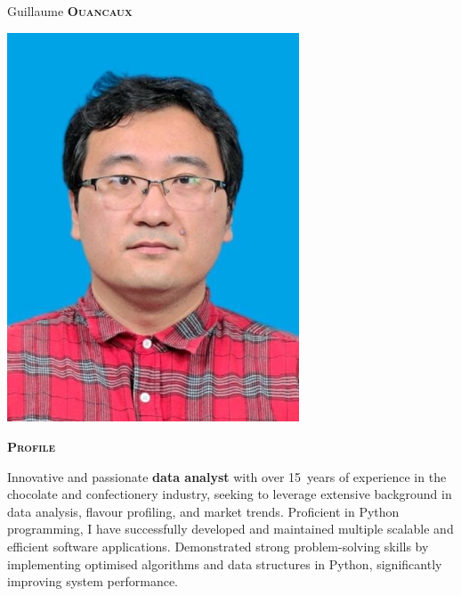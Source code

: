 \documentclass[11pt, a4paper]{article}
\newcommand{\headleft}[1]{\vspace*{3ex}\textsc{\textbf{#1}}\par%
    \vspace*{-1.5ex}\hrulefill\par\vspace*{0.7ex}}
\begin{document}
\setlength{\topskip}{0pt}
\setlength{\parindent}{0pt}
\setlength{\parskip}{0pt}
\setlength{\fboxsep}{0pt}
\pagestyle{empty}
\raggedbottom

\begin{minipage}[t]{0.33\textwidth} %
\colorbox{cvblue}{\begin{minipage}[t][5mm][t]{\textwidth}\null\hfill\null\end{minipage}}

\vspace{-.2ex} %
\colorbox{cvblue!90}{\color{white}  %
\textwidth\relax%
\begin{minipage}[t][293mm][t]{0.82\textwidth}
\raggedright
\vspace*{2.5ex}

\Large Guillaume \textbf{\textsc{Ouancaux}} \normalsize 

\null\hfill\includegraphics[width=0.65\textwidth]{./assets/thales.jpg}\hfill\null

\vspace*{0.5ex} %

\headleft{Profile}
Innovative and passionate \textbf{data analyst} with over 15~years of experience in the chocolate and confectionery industry, seeking to leverage extensive background in data analysis, flavour profiling, and market trends.
Proficient in Python programming, I have successfully developed and maintained multiple scalable and efficient software applications.
Demonstrated strong problem-solving skills by implementing optimised algorithms and data structures in Python, significantly improving system performance.


\end{minipage}}
\end{minipage}
\end{document}

